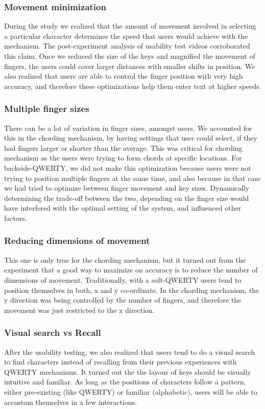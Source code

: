 \subsubsection{Movement minimization}
During the study we realized that the amount of movement involved in selecting a particular character determines the speed that users would achieve with the mechanism. The post-experiment analysis of usability test videos corroborated this claim. Once we reduced the size of the keys and magnified the movement of fingers, the users could cover larger distances with smaller shifts in position. We also realized that users are able to control the finger position with very high accuracy, and therefore these optimizations help them enter text at higher speeds.
\subsubsection{Multiple finger sizes}
There can be a lot of variation in finger sizes, amongst users. We accounted for this in the chording mechanism, by having settings that user could select, if they had fingers larger or shorter than the average. This was critical for chording mechanism as the users were trying to form chords at specific locations. For backside-QWERTY, we did not make this optimization because users were not trying to position multiple fingers at the same time, and also because in that case we had tried to optimize between finger movement and key sizes. Dynamically determining the trade-off between the two, depending on the finger size would have interfered with the optimal setting of the system, and influenced other factors.
\subsubsection{Reducing dimensions of movement}
This one is only true for the chording mechanism, but it turned out from the experiment that a good way to maximize on accuracy is to reduce the number of dimensions of movement. Traditionally, with a soft-QWERTY users tend to position themselves in both, x and y co-ordinate. In the chording mechanism, the y direction was being controlled by the number of fingers, and therefore the movement was just restricted to the x direction.
\subsubsection{Visual search vs Recall}
After the usability testing, we also realized that users tend to do a visual search to find characters instead of recalling from their previous experiences with QWERTY mechanisms. It turned out the the layour of keys should be visually intuitive and familiar. As long as the positions of characters follow a pattern, either pre-existing (like QWERTY) or familiar (alphabetic), users will be able to accustom themselves in a few interactions.
